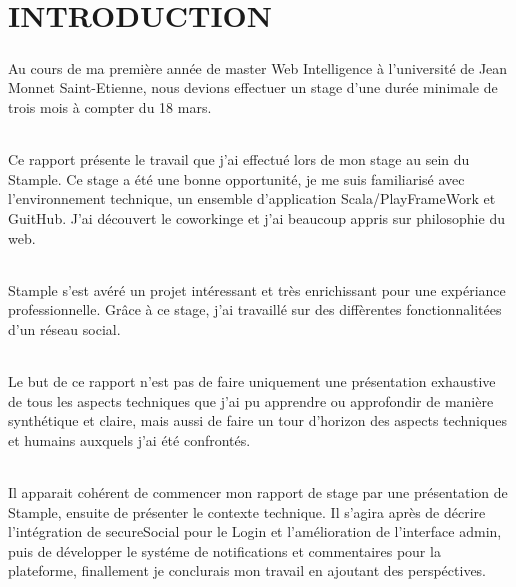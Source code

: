 \chapter{INTRODUCTION}
\paragraph{}
Au cours de ma première année de master Web Intelligence à l'université de Jean Monnet Saint-Etienne, nous devions effectuer un stage d'une durée minimale de trois mois à compter du 18 mars.
\subparagraph{}
Ce rapport présente le travail que j'ai effectué lors de mon stage au sein du Stample.
\newline
Ce stage a été une bonne opportunité, je me suis familiarisé avec l'environnement technique, un ensemble d'application Scala/PlayFrameWork et GuitHub.
J'ai découvert le coworkinge et j'ai beaucoup appris sur philosophie du web.
\subparagraph{}
Stample s'est avéré un projet intéressant et très enrichissant pour une expériance professionnelle. Gr\^ace à ce stage, j'ai travaillé sur des diffèrentes fonctionnalitées d'un réseau social.
\subparagraph{}
Le but de ce rapport n’est pas de faire uniquement une présentation exhaustive de tous les aspects techniques que j’ai pu apprendre ou approfondir de manière synthétique et claire, mais aussi de faire un tour d’horizon des aspects techniques et humains auxquels j’ai été confrontés.
\subparagraph{}
Il apparait cohérent de commencer mon rapport de stage par une présentation de Stample, ensuite de présenter le contexte technique. Il s’agira après de décrire l'intégration de secureSocial pour le Login et l'amélioration de l'interface admin, puis de développer le systéme de notifications et commentaires pour la plateforme, finallement je conclurais mon travail en ajoutant des perspéctives.
\newpage